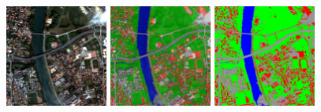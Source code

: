 \begin{figure}[!h]
  \center
  \includegraphics[width=0.3\textwidth]{../Art/MonteverdiImages/classification_chain_inputimage.jpg}
  \includegraphics[width=0.3\textwidth]{../Art/MonteverdiImages/classification_chain_fancyclassif_fusion.jpg}
  \includegraphics[width=0.3\textwidth]{../Art/MonteverdiImages/classification_chain_fancyclassif.jpg}
  \label{fig:MeanShiftVectorImageFilter}
\end{figure}






